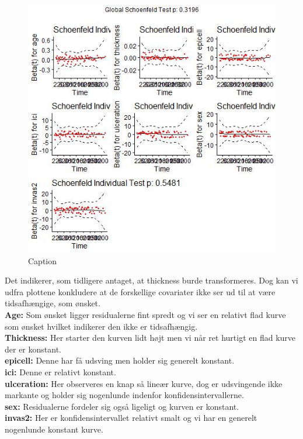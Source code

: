 \begin{figure}[h]
    \centering
    \includegraphics[width=0.7\linewidth]{Basses_kode/Billeder_duration/Schoenfeld_Residuals.jpeg}
    \caption{Caption}
    \label{fig:enter-label}
\end{figure}
\newpage
Det indikerer, som tidligere antaget, at thickness burde transformeres. Dog kan vi udfra plottene konkludere at de forskellige covariater ikke ser ud til at være tidsafhængige, som ønsket.\\
\textbf{Age:} Som ønsket ligger residualerne fint spredt og vi ser en relativt flad kurve som ønsket hvilket indikerer den ikke er tidsafhængig.\\
\textbf{Thickness:} Her starter den kurven lidt højt men vi når ret hurtigt en flad kurve der er konstant.\\
\textbf{epicell:} Denne har få udsving men holder sig generelt konstant.\\
\textbf{ici:} Denne er relativt konstant.\\
\textbf{ulceration:} Her observeres en knap så lineær kurve, dog er udsvingende ikke markante og holder sig nogenlunde indenfor konfidensintervallerne.\\
\textbf{sex:} Residualerne fordeler sig også ligeligt og kurven er konstant.\\
\textbf{invas2:} Her er konfidensintervallet relativt smalt og vi har en generelt nogenlunde konstant kurve. 
\newpage
